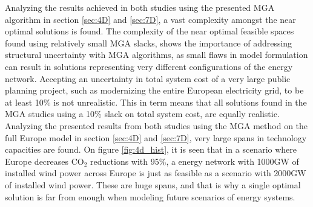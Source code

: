 Analyzing the results achieved in both studies using the presented MGA algorithm in section \ref{sec:4D} and \ref{sec:7D}, a vast complexity amongst the near optimal solutions is found. The complexity of the near optimal feasible spaces found using relatively small MGA slacks, shows the importance of addressing structural uncertainty with MGA algorithms, as small flaws in model formulation can result in solutions representing very different configurations of the energy network. 
Accepting an uncertainty in total system cost of a very large public planning project, such as modernizing the entire European electricity grid, to be at least 10\% is not unrealistic. This in term means that all solutions found in the MGA studies using a 10\% slack on total system cost, are equally realistic. Analyzing the presented results from both studies using the MGA method on the full Europe model in section \ref{sec:4D} and \ref{sec:7D}, very large spans in technology capacities are found. On figure \ref{fig:4d_hist}, it is seen that in a scenario where Europe decreases $\text{CO}_2$ reductions with 95\%, a energy network with 1000GW of installed wind power across Europe is just as feasible as a scenario with 2000GW of installed wind power. These are huge spans, and that is why a single optimal solution is far from enough when modeling future scenarios of energy systems. 

